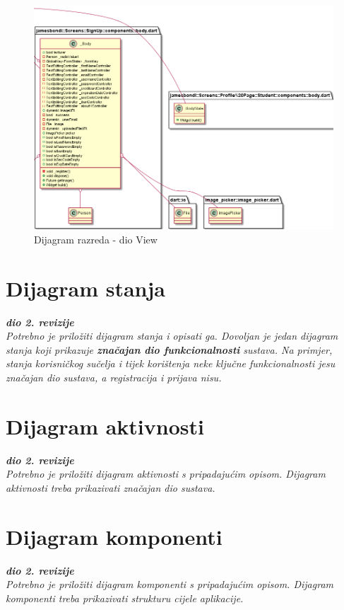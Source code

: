			\begin{figure}[hbt!]
				\includegraphics[scale=0.47]{dijagrami/View2.PNG}
				\centering
				\caption{Dijagram razreda - dio View}
				\label{fig:View2}
			\end{figure}
			
			\eject
			
		\section{Dijagram stanja}
			
			
			\textbf{\textit{dio 2. revizije}}\\
			
			\textit{Potrebno je priložiti dijagram stanja i opisati ga. Dovoljan je jedan dijagram stanja koji prikazuje \textbf{značajan dio funkcionalnosti} sustava. Na primjer, stanja korisničkog sučelja i tijek korištenja neke ključne funkcionalnosti jesu značajan dio sustava, a registracija i prijava nisu. }
			
			
			\eject 
		
		\section{Dijagram aktivnosti}
			
			\textbf{\textit{dio 2. revizije}}\\
			
			 \textit{Potrebno je priložiti dijagram aktivnosti s pripadajućim opisom. Dijagram aktivnosti treba prikazivati značajan dio sustava.}
			
			\eject
		\section{Dijagram komponenti}
		
			\textbf{\textit{dio 2. revizije}}\\
		
			 \textit{Potrebno je priložiti dijagram komponenti s pripadajućim opisom. Dijagram komponenti treba prikazivati strukturu cijele aplikacije.}